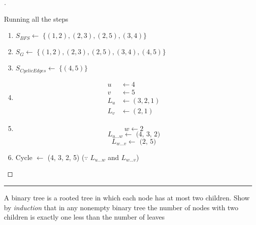 \documentclass[a4paper, 12pt]{article}
\begin{document}
\begin{proof}[\color{red}{Solution}]
\begin{center}

\end{center}

Running all the steps
\begin{enumerate}
    \item $S_{BFS}\leftarrow \; \{(1, 2), (2, 3), (2, 5), (3, 4)\}$
    \item $S_{G}\leftarrow \; \{(1, 2), (2, 3), (2, 5), (3, 4), (4,5)\}$
    \item $S_{Cyclic Edges} \leftarrow \; \{(4, 5)\}$ 
    \item \begin{align*}
        u &\leftarrow 4 \\
        v &\leftarrow 5 \\
        L_{u} &\leftarrow (3, 2, 1) \tag*{\footnotesize (Parent Hierarchy of u = 4)}\\
        L_{v} &\leftarrow (2, 1)
    \end{align*}
    \item \[ w \leftarrow 2 \tag*{\footnotesize First Common Ancestor} \]
    \[ L_{u ... w} \leftarrow \text{ (4, 3, 2)}  \]
    \[ L_{w ... v} \leftarrow \text{ (2, 5)}  \tag*{\footnotesize Reverse order} \]
    \item Cycle $\leftarrow$ (4, 3, 2, 5) \;\;\;\;\; ($\because$  $L_{u ... w}$ and  $L_{w ... v}$)
\end{enumerate}

\end{proof}



\hrule
\bigskip
\begin{question}[3]
A binary tree is a rooted tree in which each node has at most two children. Show by
{\itshape induction} that in any nonempty binary tree the number of nodes with two children is exactly one
less than the number of leaves
\end{question}
\end{document}

